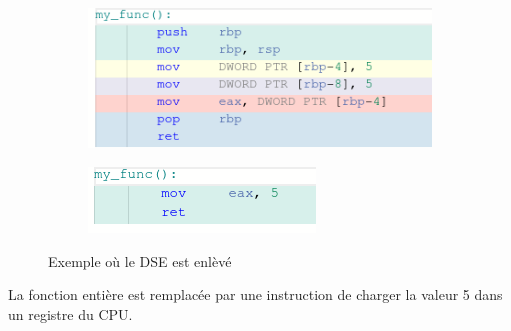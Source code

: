 \documentclass[11pt]{article} %
\begin{document}
\begin{figure}[h!]
    \centering
    \begin{subfigure}[h!]{0.4\textwidth}
        \includegraphics[width=\linewidth]{media/myfuncO0.png}
    \end{subfigure}
    \begin{subfigure}[h!]{0.4\textwidth}
        \includegraphics[width=\linewidth]{media/myfuncO1.png}
    \end{subfigure}
    \caption{Exemple o\`u le DSE est enl\`ev\'e}
\end{figure}

La fonction enti\`ere est remplac\'ee par une instruction de charger la valeur 5 dans un registre du CPU.
\end{document}
